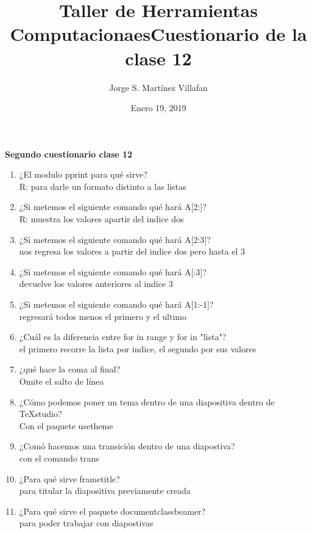 \documentclass[letterpaper, 12pt, oneside]{article}%
\title{\Huge Taller de Herramientas Computacionaes}
\author{Jorge S. Martínez Villafan}
\date{Enero 19, 2019}
\begin{document}
\maketitle
\newpage
\title{Cuestionario de la clase 12}

\textbf{Segundo cuestionario clase 12}

\begin{enumerate}
\item ¿El modulo pprint para qué sirve?\\
R: \color{red} para darle un formato distinto a las listas \color{black}
\item ¿Si metemos el siguiente comando qué hará A[2:]?\\
R: \color{red} muestra los valores apartir del indice dos \color{black}
\item ¿Si metemos el siguiente comando qué hará A[2:3]?\\
\color{red} nos regresa los valores a partir del indice dos pero hasta el 3 \color{black}
\item ¿Si metemos el siguiente comando qué hará A[:3]?\\
\color{red} devuelve los valores anteriores al indice 3 \color{black}
\item ¿Si metemos el siguiente comando qué hará A[1:-1]?\\
\color{red} regresará todos menos el primero y el ultimo \color{black}
\item ¿Cuál es la diferencia entre for in range y for in "lista"?\\
\color{red} el primero recorre la lista por indice, el segundo por sus valores \color{black}
\item ¿qué hace la coma al final?\\
\color{red} Omite el salto de línea \color{black}
\item ¿Cómo podemos poner un tema dentro de una diapositiva dentro de TeXstudio?\\
\color{red} Con el paquete usetheme \color{black}
\item ¿Comó hacemos una transición dentro de una diapostiva?\\ 
\color{red} con el comando trans \color{black}
\item ¿Para qué sirve frametitle?\\
\color{red} para titular la diapositiva previamente creada \color{black}
\item ¿Para qué sirve el paquete documentclass{beamer}?\\
\color{red} para poder trabajar con diapostivas 

\end{enumerate}
\end{document}
